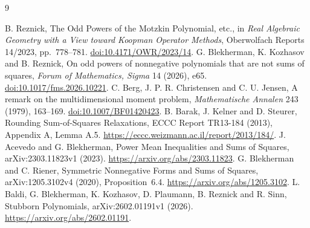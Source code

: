 \documentclass[11pt]{article}
\begin{document}
\begin{thebibliography}{9}
\raggedright
{} B. Reznick, The Odd Powers of the Motzkin Polynomial, etc.,
in \emph{Real Algebraic Geometry with a View toward Koopman
Operator Methods}, Oberwolfach Reports 14/2023, pp.~778--781.
\href{https://doi.org/10.4171/OWR/2023/14}{doi:10.4171/OWR/2023/14}.
 G. Blekherman, K. Kozhasov and B. Reznick,
On odd powers of nonnegative polynomials that are not sums of squares,
\emph{Forum of Mathematics, Sigma} 14 (2026), e65.
\href{https://doi.org/10.1017/fms.2026.10221}{doi:10.1017/fms.2026.10221}.
 C. Berg, J. P. R. Christensen and C. U. Jensen,
A remark on the multidimensional moment problem,
\emph{Mathematische Annalen} 243 (1979), 163--169.
\href{https://doi.org/10.1007/BF01420423}{doi:10.1007/BF01420423}.
 B. Barak, J. Kelner and D. Steurer,
Rounding Sum-of-Squares Relaxations, ECCC Report TR13-184 (2013),
Appendix A, Lemma A.5.
\url{https://eccc.weizmann.ac.il/report/2013/184/}.
 J. Acevedo and G. Blekherman,
Power Mean Inequalities and Sums of Squares, arXiv:2303.11823v1 (2023).
\url{https://arxiv.org/abs/2303.11823}.
 G. Blekherman and C. Riener,
Symmetric Nonnegative Forms and Sums of Squares,
arXiv:1205.3102v4 (2020), Proposition~6.4.
\url{https://arxiv.org/abs/1205.3102}.
 L. Baldi, G. Blekherman, K. Kozhasov, D. Plaumann,
B. Reznick and R. Sinn, Stubborn Polynomials,
arXiv:2602.01191v1 (2026).
\url{https://arxiv.org/abs/2602.01191}.
\end{thebibliography}
\end{document}

